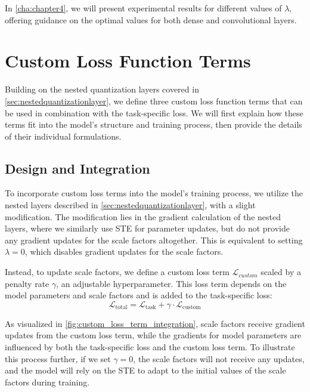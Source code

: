 In \cref{cha:chapter4}, we will present experimental results for different values of 
\( \lambda \), offering guidance on the optimal values for both dense and convolutional layers.


\section{Custom Loss Function Terms}
\label{sec:customloss}
\hspace*{1em}Building on the nested quantization layers covered in \cref{sec:nestedquantizationlayer},
we define three custom loss function terms that can be used in combination with the task-specific loss.
We will first explain how these terms fit into the model's structure and training process,
then provide the details of their individual formulations.

\subsection{Design and Integration}
\label{subsec:designandintegration}
To incorporate custom loss terms into the model's training process,
we utilize the nested layers described in \cref{sec:nestedquantizationlayer}, with a slight modification.
The modification lies in the gradient calculation of the nested layers,
where we similarly use STE for parameter updates, but do not provide any gradient updates for the scale factors altogether.
This is equivalent to setting \( \lambda = 0\), which disables gradient updates for the scale factors.

Instead, to update scale factors, we define a custom loss term \( \mathcal{L}_{custom}\) scaled by a penalty rate \( \gamma \),
an adjustable hyperparameter. This loss term depends on the model parameters and scale factors
and is added to the task-specific loss:
\[
\mathcal{L}_{\text{total}} = \mathcal{L}_{\text{task}} + \gamma \cdot \mathcal{L}_{\text{custom}}
\]

As visualized in \cref{fig:custom_loss_term_integration}, 
scale factors receive gradient updates from the custom loss term,
while the gradients for model parameters are influenced by both the task-specific loss
and the custom loss term. To illustrate this process further,
if we set \( \gamma = 0 \), the scale factors will not receive any updates,
and the model will rely on the STE to adapt to the initial values of the scale factors during training.

